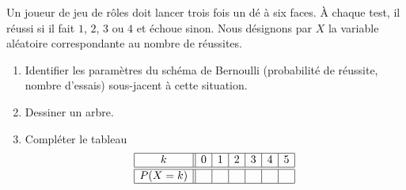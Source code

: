 
\begin{exercice}\label{exoPremiere-0086}

    Un joueur de jeu de rôles doit lancer trois fois un dé à six faces. À chaque test, il réussi si il fait \( 1\), \( 2\), \( 3\) ou \( 4\) et échoue sinon. Nous désignons par \( X\) la variable aléatoire correspondante au nombre de réussites.
    \begin{enumerate}
        \item
            Identifier les paramètres du schéma de Bernoulli (probabilité de réussite, nombre d'essais) sous-jacent à cette situation.
        \item
            Dessiner un arbre.
        \item
            Compléter le tableau
            \begin{equation*}
                \begin{array}[]{|c||c|c|c|c|c|c|}
                    \hline
                    k&0&1&2&3&4&5\\
                    \hline\hline
                    P(X=k)&&&&&&\\
                    \hline
                \end{array}
            \end{equation*}
    \end{enumerate}

\end{exercice}
